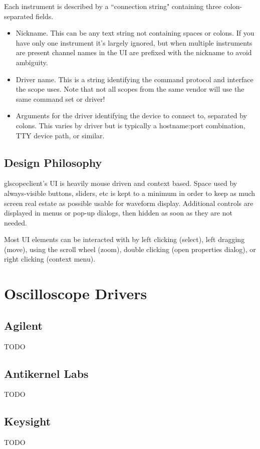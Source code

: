\documentclass[11pt]{article}
\begin{document}
Each instrument is described by a ``connection string" containing three colon-separated fields.

\begin{itemize}
\item Nickname. This can be any text string not containing spaces or colons. If you have only one instrument it's
largely ignored, but when multiple instruments are present channel names in the UI are prefixed with the nickname to
avoid ambiguity.
\item Driver name. This is a string identifying the command protocol and interface the scope uses. Note that not all
scopes from the same vendor will use the same command set or driver!
\item Arguments for the driver identifying the device to connect to, separated by colons. This varies by driver but is
typically a hostname:port combination, TTY device path, or similar.
\end{itemize}

\subsection{Design Philosophy}

glscopeclient's UI is heavily mouse driven and context based. Space used by always-visible buttons, sliders, etc is
kept to a minimum in order to keep as much screen real estate as possible usable for waveform display. Additional
controls are displayed in menus or pop-up dialogs, then hidden as soon as they are not needed.

Most UI elements can be interacted with by left clicking (select), left dragging (move), using the scroll wheel (zoom),
double clicking (open properties dialog), or right clicking (context menu).

\pagebreak
\section{Oscilloscope Drivers}

\subsection{Agilent}
TODO

\subsection{Antikernel Labs}
TODO

\subsection{Keysight}
TODO
\end{document}
